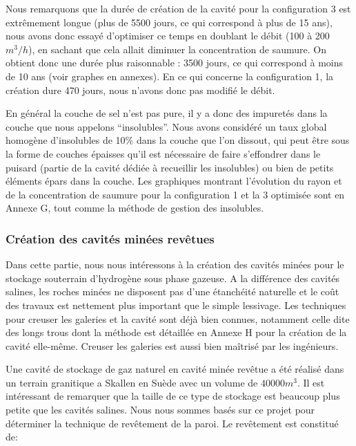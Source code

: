 \documentclass[11pt,french,a4paper]{article}
\begin{document}
Nous remarquons que la durée de création de la cavité pour la configuration 3 est extrêmement longue (plus de 5500 jours, ce qui correspond à plus de 15 ans), nous avons donc essayé d’optimiser ce temps en doublant le débit (100 à 200 $m^3/h$), en sachant que cela allait diminuer la concentration de saumure. On obtient donc une durée plus raisonnable : 3500 jours, ce qui correspond à moins de 10 ans (voir graphes en annexes). En ce qui concerne la configuration 1, la création dure 470 jours, nous n’avons donc pas modifié le débit. 

En général la couche de sel n’est pas pure, il y a donc des impuretés dans la couche que nous appelons “insolubles”. Nous avons considéré un taux global homogène d’insolubles de 10\% dans la couche que l’on dissout, qui peut être sous la forme de couches épaisses qu’il est nécessaire de faire s’effondrer dans le puisard (partie de la cavité dédiée à recueillir les insolubles) ou bien de petits éléments épars dans la couche. 
Les graphiques montrant l'évolution du rayon et de la concentration de saumure pour la configuration 1 et la 3 optimisée sont en Annexe G, tout comme la méthode de gestion des insolubles.

\subsubsection{Création des cavités minées revêtues}

Dans cette partie, nous nous intéressons à la création des cavités minées pour le stockage souterrain d’hydrogène sous phase gazeuse. A la différence des cavités salines, les roches minées ne disposent pas d’une étanchéité naturelle et le coût des travaux est nettement plus important que le simple lessivage. Les techniques pour creuser les galeries et la cavité sont déjà bien connues, notamment celle dite des longs trous dont la méthode est détaillée en Annexe H pour la création de la cavité elle-même. Creuser les galeries est aussi bien maîtrisé par les ingénieurs.

Une cavité de stockage de gaz naturel en cavité minée revêtue a été réalisé dans un terrain granitique a Skallen en Suède avec un volume de $40000 m^3$. Il est intéressant de remarquer que la taille de ce type de stockage est beaucoup plus petite que les cavités salines. Nous nous sommes basés sur ce projet pour déterminer la technique de revêtement de la paroi.
Le revêtement est constitué de:
\end{document}
